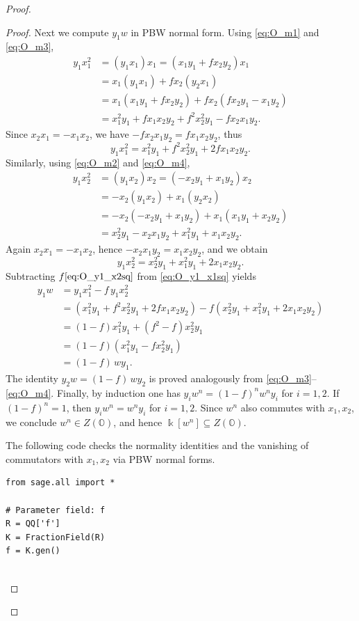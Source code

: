 \documentclass{amsart}
\theoremstyle{definition}
\theoremstyle{remark}
\numberwithin{equation}{section}
\begin{document}
\begin{proof}
\begin{proof}
Next we compute \(y_1w\) in PBW normal form. Using \eqref{eq:O_m1} and \eqref{eq:O_m3},
\begin{align*}
y_1x_1^2
&=(y_1x_1)x_1=(x_1y_1+f x_2y_2)x_1\\
&=x_1(y_1x_1)+f x_2(y_2x_1)\\
&=x_1(x_1y_1+f x_2y_2)+f x_2(f x_2y_1-x_1y_2)\\
&=x_1^2y_1+f x_1x_2y_2+f^2x_2^2y_1-f x_2x_1y_2.
\end{align*}
Since \(x_2x_1=-x_1x_2\), we have \(-f x_2x_1y_2=f x_1x_2y_2\), thus
\begin{equation}\label{eq:O_y1_x1sq}
y_1x_1^2= x_1^2y_1+ f^2x_2^2y_1+2f x_1x_2y_2.
\end{equation}
Similarly, using \eqref{eq:O_m2} and \eqref{eq:O_m4},
\begin{align*}
y_1x_2^2
&=(y_1x_2)x_2=(-x_2y_1+x_1y_2)x_2\\
&=-x_2(y_1x_2)+x_1(y_2x_2)\\
&=-x_2(-x_2y_1+x_1y_2)+x_1(x_1y_1+x_2y_2)\\
&=x_2^2y_1-x_2x_1y_2+x_1^2y_1+x_1x_2y_2.
\end{align*}
Again \(x_2x_1=-x_1x_2\), hence \(-x_2x_1y_2=x_1x_2y_2\), and we obtain
\begin{equation}\label{eq:O_y1_x2sq}
y_1x_2^2=x_2^2y_1+x_1^2y_1+2x_1x_2y_2.
\end{equation}
Subtracting \(f\eqref{eq:O_y1_x2sq}\) from \eqref{eq:O_y1_x1sq} yields
\begin{align*}
y_1w
&=y_1x_1^2-f\,y_1x_2^2\\
&=(x_1^2y_1+ f^2x_2^2y_1+2f x_1x_2y_2)-f(x_2^2y_1+x_1^2y_1+2x_1x_2y_2)\\
&=(1-f)x_1^2y_1+(f^2-f)x_2^2y_1\\
&=(1-f)(x_1^2y_1-fx_2^2y_1)\\
&=(1-f)\,w y_1.
\end{align*}
The identity \(y_2w=(1-f)\,w y_2\) is proved analogously from \eqref{eq:O_m3}--\eqref{eq:O_m4}.
Finally, by induction one has \(y_i w^n=(1-f)^n w^n y_i\) for \(i=1,2\). If \((1-f)^n=1\),
then \(y_iw^n=w^n y_i\) for \(i=1,2\). Since \(w^n\) also commutes with \(x_1,x_2\), we conclude \(w^n\in Z(\mathbb{O})\),
and hence \(\Bbbk[w^n]\subseteq Z(\mathbb{O})\).


The following code checks the normality identities and the vanishing of commutators with \(x_1,x_2\) via PBW normal forms.
\begin{verbatim}
from sage.all import *

# Parameter field: f
R = QQ['f']
K = FractionField(R)
f = K.gen()


\end{verbatim}
\end{proof}
\end{proof}
\end{document}
